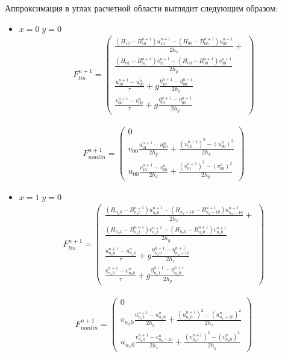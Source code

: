 Аппроксимация в углах расчетной области выглядит следующим образом:

\begin{itemize}

    \item $x=0\;y=0$
	\begin{eqnarray*}
	    F^{n+1}_{lin}=\begin{pmatrix}
		\frac{(H_{10}-B_{10}^{n+1})u_{10}^{n+1}-(H_{00}-B_{00}^{n+1})u_{00}^{n+1}}{2h_x}+\\
		\frac{(H_{01}-B_{01}^{n+1})v_{01}^{n+1}-(H_{00}-B_{00}^{n+1})v_{00}^{n+1}}{2h_y}\\
		\frac{u_{00}^{n+1}-u_{00}^{n}}{\tau}+
		g\frac{\eta_{10}^{n+1}-\eta_{00}^{n+1}}{2h_x}\\
		\frac{v_{00}^{n+1}-v_{00}^{n}}{\tau}+
		g\frac{\eta_{01}^{n+1}-\eta_{00}^{n+1}}{2h_y}
	    \end{pmatrix}
	\end{eqnarray*}

	\begin{eqnarray*}
	    F^{n+1}_{nonlin}=\begin{pmatrix}
		0\\
		v_{00}\frac{u_{01}^{n+1}-u_{00}^{n}}{2h_y}+
		\frac{(u_{10}^{n+1})^2-(u_{00}^{n})^2}{2h_x}\\
		u_{00}\frac{v_{10}^{n+1}-v_{00}^{n}}{2h_x}+
		\frac{(v_{01}^{n+1})^2-(v_{00}^{n})^2}{2h_y}
	    \end{pmatrix}
	\end{eqnarray*}

    \item $x=1\;y=0$
	\begin{eqnarray*}
	    F^{n+1}_{lin}=\begin{pmatrix}
		\frac{(H_{n_{x}0}-B_{n_{x}0}^{n+1})u_{n_{x}0}^{n+1}-(H_{n_{x}-10}-B_{n_{x}-10}^{n+1})u_{n_{x}-10}^{n+1}}{2h_x}+\\
		\frac{(H_{n_{x}1}-B_{n_{x}1}^{n+1})v_{n_{x}1}^{n+1}-(H_{n_{x}0}-B_{n_{x}0}^{n+1})v_{n_{x}0}^{n+1}}{2h_y}\\
		\frac{u_{n_{x}0}^{n+1}-u_{n_{x}0}^{n}}{\tau}+
		g\frac{\eta_{n_{x}0}^{n+1}-\eta_{n_{x}-10}^{n+1}}{2h_x}\\
		\frac{v_{n_{x}0}^{n+1}-v_{n_{x}0}^{n}}{\tau}+
		g\frac{\eta_{n_{x}1}^{n+1}-\eta_{n_{x}0}^{n+1}}{2h_y}
	    \end{pmatrix}
	\end{eqnarray*}

	\begin{eqnarray*}
	    F^{n+1}_{nonlin}=\begin{pmatrix}
		0\\
		v_{n_{x}0}\frac{u_{n_{x}1}^{n+1}-u_{n_{x}0}^{n}}{2h_y}+
		\frac{(u_{n_{x}0}^{n+1})^2-(u_{n_{x}-10}^{n})^2}{2h_x}\\
		u_{n_{x}0}\frac{v_{n_{x}0}^{n+1}-v_{n_{x}-10}^{n}}{2h_x}+
		\frac{(v_{n_{x}1}^{n+1})^2-(v_{n_{x}0}^{n})^2}{2h_y}
	    \end{pmatrix}
	\end{eqnarray*}


\end{itemize}
